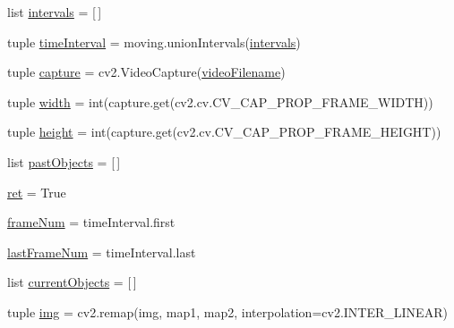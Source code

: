 \begin{DoxyCompactItemize}
\item 
list \hyperlink{namespaceclassify-objects_a3c13bd077bfc0ef3ef064d878d0f32b0}{intervals} = \mbox{[}$\,$\mbox{]}
\item 
tuple \hyperlink{namespaceclassify-objects_a8be49b00fd14af2327a9ef9c0084c8b6}{time\-Interval} = moving.\-union\-Intervals(\hyperlink{namespaceclassify-objects_a3c13bd077bfc0ef3ef064d878d0f32b0}{intervals})
\item 
tuple \hyperlink{namespaceclassify-objects_a0ee3ef5cf12219ccc80e40d1f741a53f}{capture} = cv2.\-Video\-Capture(\hyperlink{namespaceclassify-objects_a3a1d15c4d0d6976121267ea18d8dcc7d}{video\-Filename})
\item 
tuple \hyperlink{namespaceclassify-objects_a05deb0bc9671ae9d769c220c5af3e781}{width} = int(capture.\-get(cv2.\-cv.\-C\-V\-\_\-\-C\-A\-P\-\_\-\-P\-R\-O\-P\-\_\-\-F\-R\-A\-M\-E\-\_\-\-W\-I\-D\-T\-H))
\item 
tuple \hyperlink{namespaceclassify-objects_a49e08fdaa91f51e67615275c9d62099f}{height} = int(capture.\-get(cv2.\-cv.\-C\-V\-\_\-\-C\-A\-P\-\_\-\-P\-R\-O\-P\-\_\-\-F\-R\-A\-M\-E\-\_\-\-H\-E\-I\-G\-H\-T))
\item 
list \hyperlink{namespaceclassify-objects_a09225cc5985019451088fff6618bdd15}{past\-Objects} = \mbox{[}$\,$\mbox{]}
\item 
\hyperlink{namespaceclassify-objects_a67b10043840081536767e4c95033b1b0}{ret} = True
\item 
\hyperlink{namespaceclassify-objects_a5452b0de8b058d1fa012cffe547284ce}{frame\-Num} = time\-Interval.\-first
\item 
\hyperlink{namespaceclassify-objects_ade30e76ac38705c0657407fed60aa3fe}{last\-Frame\-Num} = time\-Interval.\-last
\item 
list \hyperlink{namespaceclassify-objects_af8b0f1db8c1d66c558d32713da5c1245}{current\-Objects} = \mbox{[}$\,$\mbox{]}
\item 
tuple \hyperlink{namespaceclassify-objects_a4fe0e391a47a3e5af1350ab57e1ef60e}{img} = cv2.\-remap(img, map1, map2, interpolation=cv2.\-I\-N\-T\-E\-R\-\_\-\-L\-I\-N\-E\-A\-R)
\end{DoxyCompactItemize}


